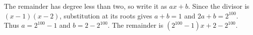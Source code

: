 The remainder has degree less than two, so write it as $ax+b$. Since the divisor is $(x-1)(x-2)$, substitution at its roots gives $a+b=1$ and $2a+b=2^{100}$. Thus $a=2^{100}-1$ and $b=2-2^{100}$. The remainder is $\boxed{(2^{100}-1)x+2-2^{100}}$.
